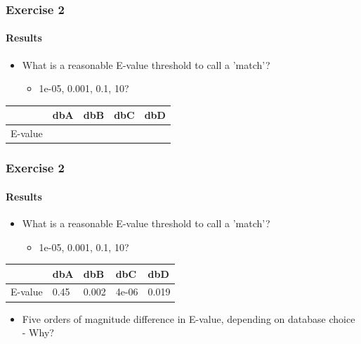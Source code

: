 \documentclass[table]{beamer}
\begin{document}
  \begin{frame}
    \frametitle{Exercise 2}
    \framesubtitle{Results}
    \begin{itemize}
      \item What is a reasonable E-value threshold to call a 'match'?
      \begin{itemize}
        \item 1e-05, 0.001, 0.1, 10?
      \end{itemize}
    \end{itemize}
    \begin{center}
	\begin{tabular}{r|l|l|l|l}
	   & dbA & dbB & dbC & dbD \\
	  \hline
	  \hline
	  E-value &      &  &  & \\
	\end{tabular}
    \end{center}
  \end{frame}

  \begin{frame}
    \frametitle{Exercise 2}
    \framesubtitle{Results}
    \begin{itemize}
      \item What is a reasonable E-value threshold to call a 'match'?
      \begin{itemize}
        \item 1e-05, 0.001, 0.1, 10?
      \end{itemize}
    \end{itemize}
    \begin{center}
	\begin{tabular}{r|l|l|l|l}
	   & dbA & dbB & dbC & dbD \\
	  \hline
	  \hline
	  E-value & 0.45 & 0.002 & 4e-06 & 0.019 \\
	\end{tabular}
    \end{center}
    \begin{itemize}
      \item Five orders of magnitude difference in E-value, depending on database choice - Why?
    \end{itemize}    
  \end{frame}
\end{document}
